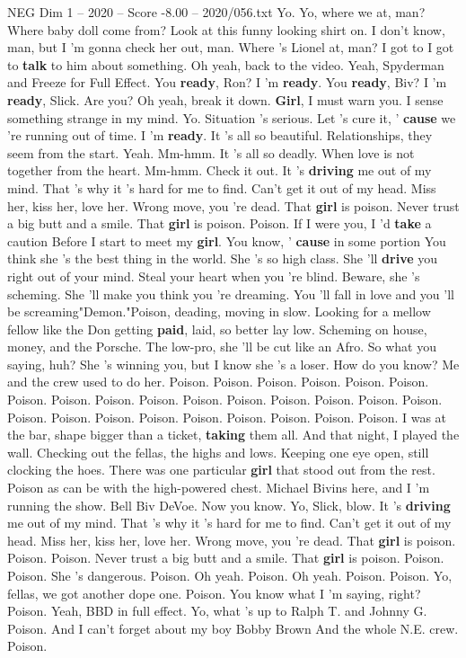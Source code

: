 \begin{textsample}{NEG Dim 1 – 2020 – Score -8.00 – 2020/056.txt}  \label{ex:f1_neg_036}
Yo.
Yo, where we at, man?
Where baby doll come from?
Look at this funny looking shirt on.
I don't know, man, but I 'm gonna check her out, man.
Where 's Lionel at, man?
I got to I got to \textbf{talk} to him about something.
Oh yeah, back to the video.
Yeah, Spyderman and Freeze for Full Effect.
You \textbf{ready}, Ron?
I 'm \textbf{ready}.
You \textbf{ready}, Biv?
I 'm \textbf{ready}, Slick.
Are you?
Oh yeah, break it down. \textbf{Girl}, I must warn you.
I sense something strange in my mind.
Yo.
Situation 's serious.
Let 's cure it, ' \textbf{cause} we 're running out of time.
I 'm \textbf{ready}.
It 's all so beautiful.
Relationships, they seem from the start.
Yeah.
Mm-hmm.
It 's all so deadly.
When love is not together from the heart.
Mm-hmm.
Check it out.
It 's \textbf{driving} me out of my mind.
That 's why it 's hard for me to find.
Can't get it out of my head.
Miss her, kiss her, love her.
Wrong move, you 're dead.
That \textbf{girl} is poison.
Never trust a big butt and a smile.
That \textbf{girl} is poison.
Poison.
If I were you, I 'd \textbf{take} a caution Before I start to meet my \textbf{girl}.
You know, ' \textbf{cause} in some portion You think she 's the best thing in the world.
She 's so high class.
She 'll \textbf{drive} you right out of your mind.
Steal your heart when you 're blind.
Beware, she 's scheming.
She 'll make you think you 're dreaming.
You 'll fall in love and you 'll be screaming"Demon."Poison, deading, moving in slow.
Looking for a mellow fellow like the Don getting \textbf{paid}, laid, so better lay low.
Scheming on house, money, and the Porsche.
The low-pro, she 'll be cut like an Afro.
So what you saying, huh?
She 's winning you, but I know she 's a loser.
How do you know?
Me and the crew used to do her.
Poison.
Poison.
Poison.
Poison.
Poison.
Poison.
Poison.
Poison.
Poison.
Poison.
Poison.
Poison.
Poison.
Poison.
Poison.
Poison.
Poison.
Poison.
Poison.
Poison.
Poison.
Poison.
Poison.
Poison.
Poison.
I was at the bar, shape bigger than a ticket, \textbf{taking} them all.
And that night, I played the wall.
Checking out the fellas, the highs and lows.
Keeping one eye open, still clocking the hoes.
There was one particular \textbf{girl} that stood out from the rest.
Poison as can be with the high-powered chest.
Michael Bivins here, and I 'm running the show.
Bell Biv DeVoe.
Now you know.
Yo, Slick, blow.
It 's \textbf{driving} me out of my mind.
That 's why it 's hard for me to find.
Can't get it out of my head.
Miss her, kiss her, love her.
Wrong move, you 're dead.
That \textbf{girl} is poison.
Poison.
Poison.
Never trust a big butt and a smile.
That \textbf{girl} is poison.
Poison.
Poison.
She 's dangerous.
Poison.
Oh yeah.
Poison.
Oh yeah.
Poison.
Poison.
Yo, fellas, we got another dope one.
Poison.
You know what I 'm saying, right?
Poison.
Yeah, BBD in full effect.
Yo, what 's up to Ralph T. and Johnny G.
Poison.
And I can't forget about my boy Bobby Brown And the whole N.E. crew.
Poison.

\end{textsample}
